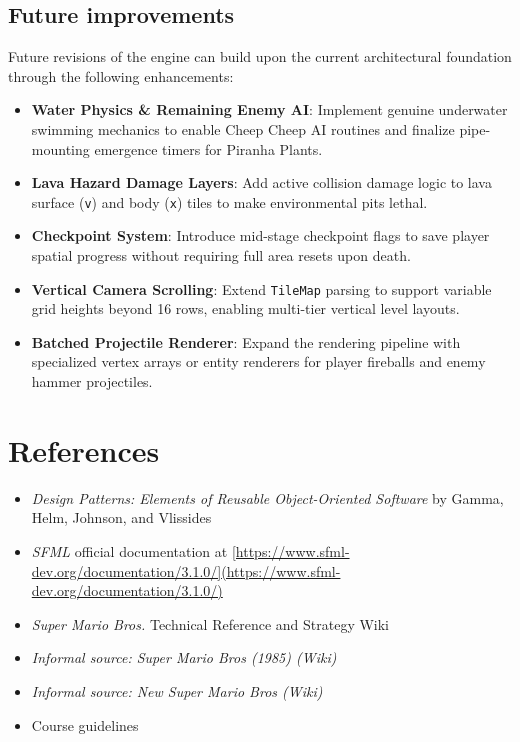 \documentclass[12pt, a4paper]{article}
\begin{document}
\newpage

\subsection{Future improvements}

Future revisions of the engine can build upon the current architectural foundation through the following enhancements:

\begin{itemize}
\item \textbf{Water Physics \& Remaining Enemy AI}: Implement genuine underwater swimming mechanics to enable Cheep Cheep AI routines and finalize pipe-mounting emergence timers for Piranha Plants.
\item \textbf{Lava Hazard Damage Layers}: Add active collision damage logic to lava surface (\texttt{v}) and body (\texttt{x}) tiles to make environmental pits lethal.
\item \textbf{Checkpoint System}: Introduce mid-stage checkpoint flags to save player spatial progress without requiring full area resets upon death.
\item \textbf{Vertical Camera Scrolling}: Extend \texttt{TileMap} parsing to support variable grid heights beyond 16 rows, enabling multi-tier vertical level layouts.
\item \textbf{Batched Projectile Renderer}: Expand the rendering pipeline with specialized vertex arrays or entity renderers for player fireballs and enemy hammer projectiles.
\end{itemize}

\newpage

\section{References}

\begin{itemize}
\item \textit{Design Patterns: Elements of Reusable Object-Oriented Software} by Gamma, Helm, Johnson, and Vlissides
\item \textit{SFML} official documentation at \url{[https://www.sfml-dev.org/documentation/3.1.0/](https://www.sfml-dev.org/documentation/3.1.0/)}
\item \textit{Super Mario Bros.} Technical Reference and Strategy Wiki
\item \textit{Informal source: Super Mario Bros (1985) (Wiki)}
\item \textit{Informal source: New Super Mario Bros (Wiki)}
\item Course guidelines
\end{itemize}
\end{document}
